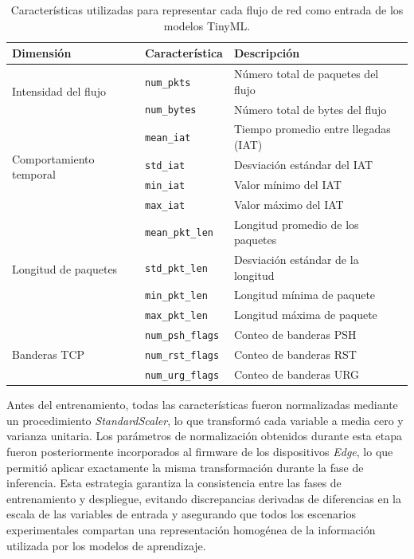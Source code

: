 \documentclass[journal,article,submit,moreauthors]{Definitions/mdpi}
\begin{document}
\begin{table}[ht]
\centering
\caption{Características utilizadas para representar cada flujo de red como entrada de los modelos TinyML.}
\label{tab:flow_features}
\footnotesize
\begin{tabular}{lll}
\toprule
\textbf{Dimensión} & \textbf{Característica} & \textbf{Descripción} \\
\midrule
\multirow{2}{*}{Intensidad del flujo}
& \texttt{num\_pkts} & Número total de paquetes del flujo \\
& \texttt{num\_bytes} & Número total de bytes del flujo \\
\midrule

\multirow{4}{*}{Comportamiento temporal}
& \texttt{mean\_iat} & Tiempo promedio entre llegadas (IAT) \\
& \texttt{std\_iat} & Desviación estándar del IAT \\
& \texttt{min\_iat} & Valor mínimo del IAT \\
& \texttt{max\_iat} & Valor máximo del IAT \\
\midrule

\multirow{4}{*}{Longitud de paquetes}
& \texttt{mean\_pkt\_len} & Longitud promedio de los paquetes \\
& \texttt{std\_pkt\_len} & Desviación estándar de la longitud \\
& \texttt{min\_pkt\_len} & Longitud mínima de paquete \\
& \texttt{max\_pkt\_len} & Longitud máxima de paquete \\
\midrule

\multirow{3}{*}{Banderas TCP}
& \texttt{num\_psh\_flags} & Conteo de banderas PSH \\
& \texttt{num\_rst\_flags} & Conteo de banderas RST \\
& \texttt{num\_urg\_flags} & Conteo de banderas URG \\
\bottomrule
\end{tabular}
\end{table}

Antes del entrenamiento, todas las características fueron normalizadas mediante un procedimiento \textit{StandardScaler}, lo que transformó cada variable a media cero y varianza unitaria. Los parámetros de normalización obtenidos durante esta etapa fueron posteriormente incorporados al firmware de los dispositivos \textit{Edge}, lo que permitió aplicar exactamente la misma transformación durante la fase de inferencia. Esta estrategia garantiza la consistencia entre las fases de entrenamiento y despliegue, evitando discrepancias derivadas de diferencias en la escala de las variables de entrada y asegurando que todos los escenarios experimentales compartan una representación homogénea de la información utilizada por los modelos de aprendizaje.
\end{document}
